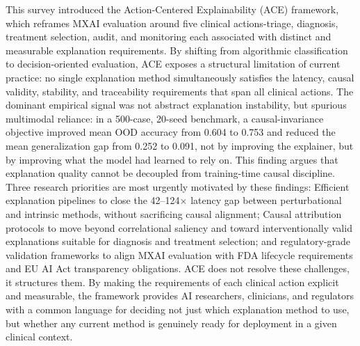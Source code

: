 \documentclass[pdflatex,sn-mathphys-num]{sn-jnl}%
\theoremstyle{thmstyleone}%
\theoremstyle{thmstyletwo}%
\theoremstyle{thmstylethree}%
\begin{document}
\begin{itemize}

This survey introduced the Action-Centered Explainability (ACE) framework, which reframes MXAI evaluation around five clinical actions-triage, diagnosis, treatment selection, audit, and monitoring each associated with distinct and measurable explanation requirements. By shifting from algorithmic classification to decision-oriented evaluation, ACE exposes a structural limitation of current practice: no single explanation method simultaneously satisfies the latency, causal validity, stability, and traceability requirements that span all clinical actions.
The dominant empirical signal was not abstract explanation instability, but spurious multimodal reliance: in a 500-case, 20-seed benchmark, a causal-invariance objective improved mean OOD accuracy from 0.604 to 0.753 and reduced the mean generalization gap from 0.252 to 0.091, not by improving the explainer, but by improving what the model had learned to rely on. This finding argues that explanation quality cannot be decoupled from training-time causal discipline.
Three research priorities are most urgently motivated by these findings: Efficient explanation pipelines to close the 42–124× latency gap between perturbational and intrinsic methods, without sacrificing causal alignment; Causal attribution protocols to move beyond correlational saliency and toward interventionally valid explanations suitable for diagnosis and treatment selection; and regulatory-grade validation frameworks to align MXAI evaluation with FDA lifecycle requirements and EU AI Act transparency obligations.
ACE does not resolve these challenges, it structures them. By making the requirements of each clinical action explicit and measurable, the framework provides AI researchers, clinicians, and regulators with a common language for deciding not just which explanation method to use, but whether any current method is genuinely ready for deployment in a given clinical context.








\end{itemize}
\end{document}

